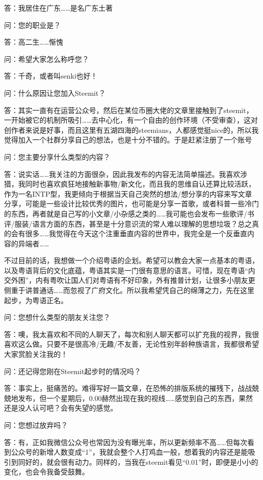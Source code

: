 \documentclass[]{ctexbook}
\begin{document}
答：我居住在广东\ldots{}\ldots{}是名广东土著

问：您的职业是？

答：高二生\ldots{}\ldots{}惭愧

问：希望大家怎么称呼您？

答：千奇，或者叫senki也好！

问：什么原因让您加入Steemit？

答：其实一直有在运营公众号，然后在某位币圈大佬的文章里接触到了steemit，一开始被它的机制所吸引\ldots{}\ldots{}去中心化，有一个自由的创作环境（不受审查），这对创作者来说是好事，而且这里有五湖四海的steemians，人都感觉挺nice的，所以我觉得加入一个社群分享自己的想法，也是十分不错的。于是赶紧注册了一个账号

问：您主要分享什么类型的内容？

答：说实话\ldots{}\ldots{}我关注的方面很杂，因此我发布的内容无法简单描述。我喜欢涉猎，我同时也喜欢疯狂地接触新事物/新文化，而且我的思维自认还算比较活跃，作为一名INTP型，我更倾向于根据当天自己突然的想法/想分享的内容来写文章分享，可能是一些设计比较优秀的图片，也可能是分享一首歌，或者科普一些冷门的东西，再者就是自己写的小文章/小杂感之类的\ldots{}\ldots{}我可能也会发布一些歌评/书评/服装/语言方面的东西，甚至是十分意识流的常人难以理解的思想垃圾？总之真的会有很多\ldots{}\ldots{}我觉得在今天这个注重垂直内容的世界中，我完全是一个反垂直内容的异端者\ldots{}\ldots{}

不过目前的话，我想做一个介绍粤语的企划。希望可以教会大家一点基本的粤语，以及粤语背后的文化底蕴，粤语其实是一门很有意思的语言。可惜，现在粤语``内交外困''，内有粤吹让国人们对粤语有不好印象，外有推普计划，让很多小朋友更侧重于讲普通话\ldots{}\ldots{}而忽视了广府文化。所以我希望凭自己的绵薄之力，先在这里起步，为粤语正名。

问：您想什么类型的朋友关注您？

答：噢，我太喜欢和不同的人聊天了，每次和别人聊天都可以扩充我的视界，我很喜欢这么做。只要不是很高冷/无趣/不友善，无论性别年龄种族语言，我都很希望大家赏脸关注我的！

问：还记得您刚在Steemit起步时的情况吗？

答：事实上，挺痛苦的。难得写好一篇文章，在恐怖的排版系统的摧残下，战战兢兢地发布，但一个星期后，0.00赫然出现在我的视线\ldots{}\ldots{}感觉到自己的东西，果然还是没人认可吧？会有失望的感觉。

问：您想过放弃吗？

答：有，正如我微信公众号也常因为没有曝光率，所以更新频率不高\ldots{}\ldots{}但每次看到公众号的新增人数变成``1''，我就会整个人打鸡血一般，想着我的内容还是能吸引到同好的，就会很有动力。同样的，当我在steemit看见``0.01''时，即便是小小的变化，也会令我备受鼓舞。
\end{document}
